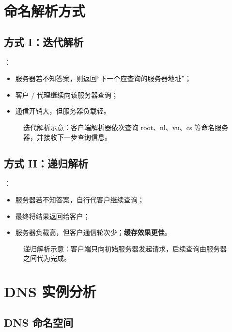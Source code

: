 \section{命名解析方式}

\subsection{方式 I：迭代解析}

：
\begin{itemize}
  \item 服务器若不知答案，则返回“下一个应查询的服务器地址”；
  \item 客户 / 代理继续向该服务器查询；
  \item 通信开销大，但服务器负载轻。
\end{itemize}

\begin{figure}[H]
  \centering
  \caption{迭代解析示意：客户端解析器依次查询 root、nl、vu、cs 等命名服务器，并接收下一步查询信息。}
\end{figure}

\subsection{方式 II：递归解析}

：
\begin{itemize}
  \item 服务器若不知答案，自行代客户继续查询；
  \item 最终将结果返回给客户；
  \item 服务器负载高，但客户通信轮次少；\textbf{缓存效果更佳}。
\end{itemize}

\begin{figure}[H]
  \centering
  \caption{递归解析示意：客户端只向初始服务器发起请求，后续查询由服务器之间代为完成。}
\end{figure}

\section{DNS 实例分析}

\subsection{DNS 命名空间}

